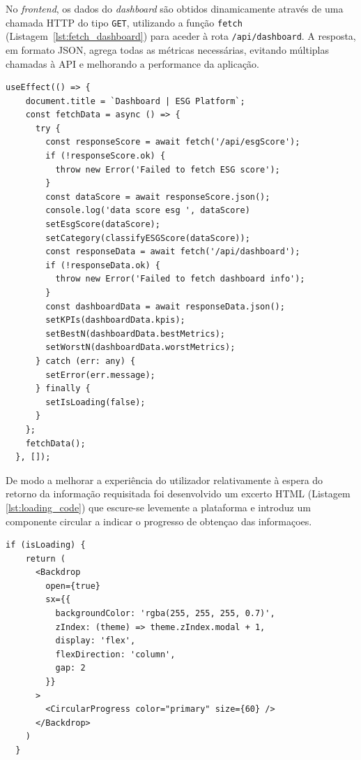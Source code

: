 No \textit{frontend}, os dados do \textit{dashboard} são obtidos dinamicamente através de uma chamada HTTP do tipo \texttt{GET}, utilizando a função \texttt{fetch} (Listagem~\ref{lst:fetch_dashboard}) para aceder à rota \texttt{/api/dashboard}. A resposta, em formato JSON, agrega todas as métricas necessárias, evitando múltiplas chamadas à API e melhorando a performance da aplicação.

\begin{lstlisting}[style=customts, caption={Função responsável por obter os dados do ESG Score e do dashboard no carregamento do componente}, label={lst:fetch_dashboard}]
 useEffect(() => {
    document.title = `Dashboard | ESG Platform`;
    const fetchData = async () => {
      try {
        const responseScore = await fetch('/api/esgScore');
        if (!responseScore.ok) {
          throw new Error('Failed to fetch ESG score');
        }
        const dataScore = await responseScore.json();
        console.log('data score esg ', dataScore)
        setEsgScore(dataScore);
        setCategory(classifyESGScore(dataScore));
        const responseData = await fetch('/api/dashboard');
        if (!responseData.ok) {
          throw new Error('Failed to fetch dashboard info');
        }
        const dashboardData = await responseData.json();
        setKPIs(dashboardData.kpis);
        setBestN(dashboardData.bestMetrics);
        setWorstN(dashboardData.worstMetrics);
      } catch (err: any) {
        setError(err.message);
      } finally {
        setIsLoading(false);
      }
    };
    fetchData();
  }, []);
\end{lstlisting}

De modo a melhorar a experiência do utilizador relativamente à espera do retorno da informação requisitada foi desenvolvido um excerto HTML (Listagem \ref{lst:loading_code}) que escure-se levemente a plataforma e introduz um componente circular a indicar o progresso de obtençao das informaçoes.

\begin{lstlisting}[style=customts, caption={Componente mostrado no carregamento da página}, label={lst:loading_code}]
  if (isLoading) {
    return (
      <Backdrop
        open={true}
        sx={{
          backgroundColor: 'rgba(255, 255, 255, 0.7)',
          zIndex: (theme) => theme.zIndex.modal + 1,
          display: 'flex',
          flexDirection: 'column',
          gap: 2
        }}
      >
        <CircularProgress color="primary" size={60} />
      </Backdrop>
    )
  }
\end{lstlisting}

